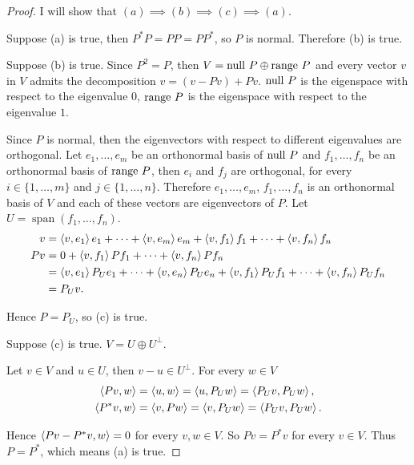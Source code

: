 \begin{proof}
    I will show that $(a) \implies (b) \implies (c) \implies (a)$.

    Suppose (a) is true, then $P^{*}P = PP = PP^{*}$, so $P$ is normal. Therefore (b) is true.

    Suppose (b) is true. Since $P^{2} = P$, then $V = \operatorname{null}\,{P}\oplus\operatorname{range}\,{P}$ and every vector $v$ in $V$ admits the decomposition $v = (v - Pv) + Pv$. $\operatorname{null}\,{P}$ is the eigenspace with respect to the eigenvalue $0$, $\operatorname{range}\,{P}$ is the eigenspace with respect to the eigenvalue $1$.

    Since $P$ is normal, then the eigenvectors with respect to different eigenvalues are orthogonal. Let $e_{1}, \ldots, e_{m}$ be an orthonormal basis of $\operatorname{null}\,{P}$ and $f_{1}, \ldots, f_{n}$ be an orthonormal basis of $\operatorname{range}\,{P}$, then $e_{i}$ and $f_{j}$ are orthogonal, for every $i\in\{1,\ldots, m\}$ and $j\in\{ 1,\ldots,n \}$. Therefore $e_{1}, \ldots, e_{m}$, $f_{1}, \ldots, f_{n}$ is an orthonormal basis of $V$ and each of these vectors are eigenvectors of $P$. Let $U = \operatorname{span}(f_{1}, \ldots, f_{n})$.
    \begin{align*}
        v  & = \left\langle{v,e_{1}}\right\rangle e_{1} + \cdots + \left\langle{v,e_{m}}\right\rangle e_{m} + \left\langle{v, f_{1}}\right\rangle f_{1} + \cdots + \left\langle{v, f_{n}}\right\rangle f_{n}                       \\
        Pv & = 0 + \left\langle{v, f_{1}}\right\rangle Pf_{1} + \cdots + \left\langle{v, f_{n}}\right\rangle Pf_{n}                                                                                \\
           & = \left\langle{v, e_{1}}\right\rangle P_{U}e_{1} + \cdots + \left\langle{v, e_{n}}\right\rangle P_{U}e_{n} + \left\langle{v, f_{1}}\right\rangle P_{U}f_{1} + \cdots + \left\langle{v, f_{n}}\right\rangle P_{U}f_{n} \\
           & = P_{U}v.
    \end{align*}

    Hence $P = P_{U}$, so (c) is true.

    Suppose (c) is true. $V = U\oplus U^{\bot}$.

    Let $v\in V$ and $u\in U$, then $v - u\in U^{\bot}$. For every $w\in V$
    \begin{align*}
        \left\langle{Pv, w}\right\rangle     & = \left\langle{u, w}\right\rangle = \left\langle{u, P_{U}w}\right\rangle = \left\langle{P_{U}v, P_{U}w}\right\rangle,  \\
        \left\langle{P^{*}v, w}\right\rangle & = \left\langle{v, Pw}\right\rangle = \left\langle{v, P_{U}w}\right\rangle = \left\langle{P_{U}v, P_{U}w}\right\rangle.
    \end{align*}

    Hence $\left\langle{Pv - P^{*}v, w}\right\rangle = 0$ for every $v, w\in V$. So $Pv = P^{*}v$ for every $v\in V$. Thus $P = P^{*}$, which means (a) is true.
\end{proof}
\newpage

